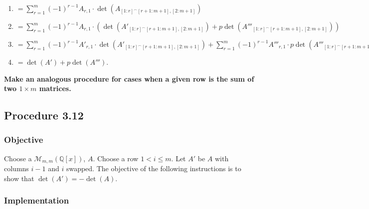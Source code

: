 \documentclass[twocolumn]{article}
\newcommand{\procedure}[2][]{\subsection*{Procedure #2 \ifthenelse{\equal{#1}{}}{}{(#1)}}\label{sec:procedure #2}}
\newcommand{\objective}{\subsubsection*{Objective}}
\newcommand{\implementation}{\subsubsection*{Implementation}}
\begin{document}
\begin{enumerate}
\begin{enumerate}
						\begin{enumerate}
							\item $=\sum_{r=1}^m (-1)^{r-1}A_{r,1}\cdot\det(A_{[1:r]^\frown[r+1:m+1],[2:m+1]})$
							\item $=\sum_{r=1}^m (-1)^{r-1}A_{r,1}\cdot(\det(A'_{[1:r]^\frown[r+1:m+1],[2:m+1]})+p\det(A'''_{[1:r]^\frown[r+1:m+1],[2:m+1]}))$
							\item $=\sum_{r=1}^m (-1)^{r-1}A'_{r,1}\cdot\det(A'_{[1:r]^\frown[r+1:m+1],[2:m+1]})+\sum_{r=1}^m (-1)^{r-1}A'''_{r,1}\cdot p\det(A'''_{[1:r]^\frown[r+1:m+1],[2:m+1]})$
							\item $=\det(A')+p\det(A''')$.
						\end{enumerate}
					\end{enumerate}
				\end{enumerate}
			\textbf{Make an analogous procedure for cases when a given row is the sum of two $1\times m$ matrices.}
		\procedure{3.12}
			\objective
				Choose a $\mathcal{M}_{m,m}(\mathbb{Q}[x])$, $A$. Choose a row $1<i\le m$. Let $A'$ be $A$ with columns $i-1$ and $i$ swapped. The objective of the following instructions is to show that $\det(A')=-\det(A)$.
			\implementation
\end{document}
